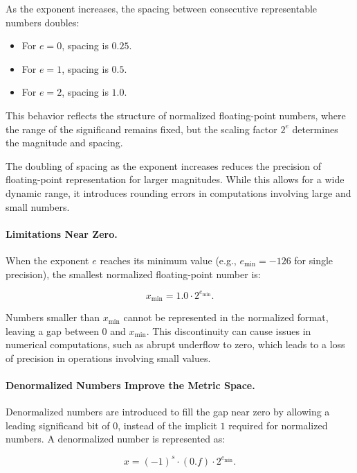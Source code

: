 As the exponent increases, the spacing between consecutive representable numbers doubles:
\begin{itemize}
    \item For \( e = 0 \), spacing is \( 0.25 \).
    \item For \( e = 1 \), spacing is \( 0.5 \).
    \item For \( e = 2 \), spacing is \( 1.0 \).
\end{itemize}

This behavior reflects the structure of normalized floating-point numbers, where the range of the significand remains fixed, but the scaling factor \( 2^e \) determines the magnitude and spacing.

The doubling of spacing as the exponent increases reduces the precision of floating-point representation for larger magnitudes. While this allows for a wide dynamic range, it introduces rounding errors in computations involving large and small numbers.

\paragraph{Limitations Near Zero.}
When the exponent \( e \) reaches its minimum value (e.g., \( e_{\text{min}} = -126 \) for single precision), the smallest normalized floating-point number is:

\[
x_{\text{min}} = 1.0 \cdot 2^{e_{\text{min}}}.
\]

Numbers smaller than \( x_{\text{min}} \) cannot be represented in the normalized format, leaving a gap between \( 0 \) and \( x_{\text{min}} \). This discontinuity can cause issues in numerical computations, such as abrupt underflow to zero, which leads to a loss of precision in operations involving small values.

\paragraph{Denormalized Numbers Improve the Metric Space.}
Denormalized numbers are introduced to fill the gap near zero by allowing a leading significand bit of \( 0 \), instead of the implicit \( 1 \) required for normalized numbers. A denormalized number is represented as:

\[
x = (-1)^s \cdot (0.f) \cdot 2^{e_{\text{min}}}.
\]

